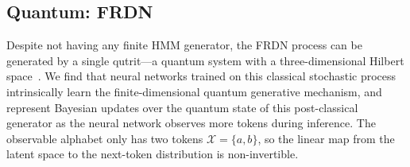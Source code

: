 \documentclass[prx,nofootinbib,onecolumn,showkeys,groupaddress,preprintnumbers,floatfix,
superscriptaddress]{revtex4-1}
\newcommand{\SSet}{\boldsymbol{\mathcal{S}}}
\begin{document}


\subsection{Quantum: FRDN}


%
%
%


Despite not having any finite HMM generator,
the FRDN process can be generated by a single qutrit---a quantum system with a three-dimensional Hilbert space~\cite{Fanizza24_Quantum}.
We find that neural networks trained on this classical stochastic process intrinsically learn the
finite-dimensional quantum generative mechanism, and represent Bayesian updates over the quantum state of this post-classical generator as the neural network observes more tokens during inference.
The observable alphabet only has two tokens $\mathcal{X} = \{ a, b \}$,
so the linear map from the latent space to the next-token distribution is non-invertible.  



\end{document}
